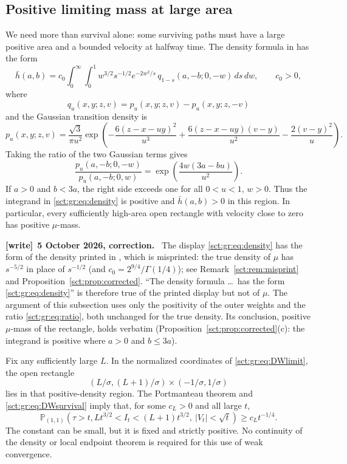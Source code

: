 \documentclass[11pt,letterpaper]{article}
\theoremstyle{definition}\newtheorem{remark}[theorem]{Remark}
\newcommand{\Pp}{\mathbb P}\newcommand{\Ee}{\mathbb E}
\newenvironment{writenote}[1][]{\par\smallskip\begingroup\small
 \noindent\textbf{[write]}\if\relax\detokenize{#1}\relax\else~\textbf{#1.}\fi\ }%
 {\par\endgroup\smallskip}
\begin{document}
\subsection{Positive limiting mass at large area}

We need more than survival alone: some surviving paths must have a large
positive area and a bounded velocity at halfway time. The density formula in
\cite[Theorem 1]{dw} has the form
\begin{equation}\label{sct:gr:eq:density}
 \bar h(a,b)=c_0\int_0^\infty\int_0^1
 w^{3/2}s^{-1/2}e^{-2w^2/s}\,
 q_{1-s}(a,-b;0,-w)\,ds\,dw,
 \qquad c_0>0,
\end{equation}
where
\[
 q_u(x,y;z,v)=p_u(x,y;z,v)-p_u(x,y;z,-v)
\]
and the Gaussian transition density is
\begin{equation}\label{sct:gr:eq:gaussian}
 p_u(x,y;z,v)=\frac{\sqrt3}{\pi u^2}
 \exp\!\left(-\frac{6(z-x-uy)^2}{u^3}
 +\frac{6(z-x-uy)(v-y)}{u^2}
 -\frac{2(v-y)^2}{u}\right).
\end{equation}
Taking the ratio of the two Gaussian terms gives
\begin{equation}\label{sct:gr:eq:ratio}
 \frac{p_u(a,-b;0,-w)}{p_u(a,-b;0,w)}
 =\exp\!\left(\frac{4w(3a-bu)}{u^2}\right).
\end{equation}
If $a>0$ and $b<3a$, the right side exceeds one for all $0<u<1$, $w>0$.
Thus the integrand in \eqref{sct:gr:eq:density} is positive and $\bar h(a,b)>0$
in this region. In particular, every sufficiently high-area open rectangle
with velocity close to zero has positive $\mu$-mass.
\begin{writenote}[5 October 2026, correction]
The display \eqref{sct:gr:eq:density} has the form of the density printed in \cite[Theorem~1]{dw}, which is misprinted: the true density of $\mu$ has $s^{-5/2}$ in place of $s^{-1/2}$ (and $c_0=2^{9/4}/\Gamma(1/4)$); see Remark~\ref{sct:rem:misprint} and Proposition~\ref{sct:prop:corrected}. ``The density formula \dots\ has the form \eqref{sct:gr:eq:density}'' is therefore true of the printed display but not of $\mu$. The argument of this subsection uses only the positivity of the outer weights and the ratio \eqref{sct:gr:eq:ratio}, both unchanged for the true density. Its conclusion, positive $\mu$-mass of the rectangle, holds verbatim (Proposition~\ref{sct:prop:corrected}(c): the integrand is positive where $a>0$ and $b\le3a$).
\end{writenote}

Fix any sufficiently large $L$. In the normalized coordinates of
\eqref{sct:gr:eq:DWlimit}, the open rectangle
\[
 (L/\sigma,(L+1)/\sigma)\times(-1/\sigma,1/\sigma)
\]
lies in that positive-density region. The Portmanteau theorem and
\eqref{sct:gr:eq:DWsurvival} imply that, for some $c_L>0$ and all large $t$,
\begin{equation}\label{sct:gr:eq:halfway}
 \Pp_{(1,1)}\!\left(\tau>t,
 Lt^{3/2}<I_t<(L+1)t^{3/2},\ |V_t|<\sqrt t\right)
 \ge c_Lt^{-1/4}.
\end{equation}
The constant can be small, but it is fixed and strictly positive. No
continuity of the density or local endpoint theorem is required for this use
of weak convergence.
\end{document}
